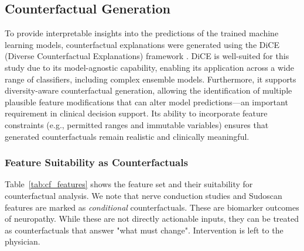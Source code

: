 \documentclass[pdflatex,sn-vancouver-num]{sn-jnl}
\begin{document}
\subsection{Counterfactual Generation}
To provide interpretable insights into the predictions of the trained machine learning models, counterfactual explanations were generated using the DiCE (Diverse Counterfactual Explanations) framework \cite{mothilal2020explaining}. DiCE is well-suited for this study due to its model-agnostic capability, enabling its application across a wide range of classifiers, including complex ensemble models. Furthermore, it supports diversity-aware counterfactual generation, allowing the identification of multiple plausible feature modifications that can alter model predictions—an important requirement in clinical decision support. Its ability to incorporate feature constraints (e.g., permitted ranges and immutable variables) ensures that generated counterfactuals remain realistic and clinically meaningful.

\subsubsection{Feature Suitability as Counterfactuals}
Table~\ref{tab:cf_features} shows the feature set and their suitability for counterfactual analysis. We note that nerve conduction studies and Sudoscan features are marked as \textit{conditional} counterfactuals. These are biomarker outcomes of neuropathy. While these are not directly actionable inputs, they can be treated as counterfactuals that answer "what must change". Intervention is left to the physician. 
\end{document}
